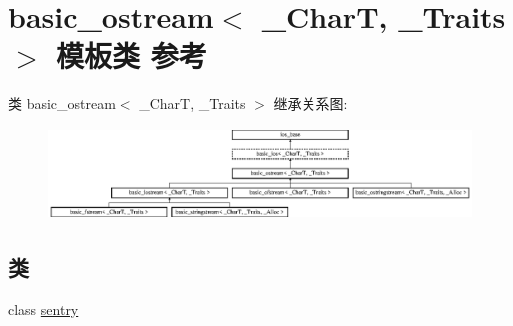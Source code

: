 \hypertarget{classbasic__ostream}{}\section{basic\+\_\+ostream$<$ \+\_\+\+CharT, \+\_\+\+Traits $>$ 模板类 参考}
\label{classbasic__ostream}
类 basic\+\_\+ostream$<$ \+\_\+\+CharT, \+\_\+\+Traits $>$ 继承关系图\+:\begin{figure}[H]
\begin{center}
\leavevmode
\includegraphics[height=2.413793cm]{classbasic__ostream}
\end{center}
\end{figure}
\subsection*{类}
\begin{DoxyCompactItemize}
\item 
class \hyperlink{classbasic__ostream_1_1sentry}{sentry}
\end{DoxyCompactItemize}
